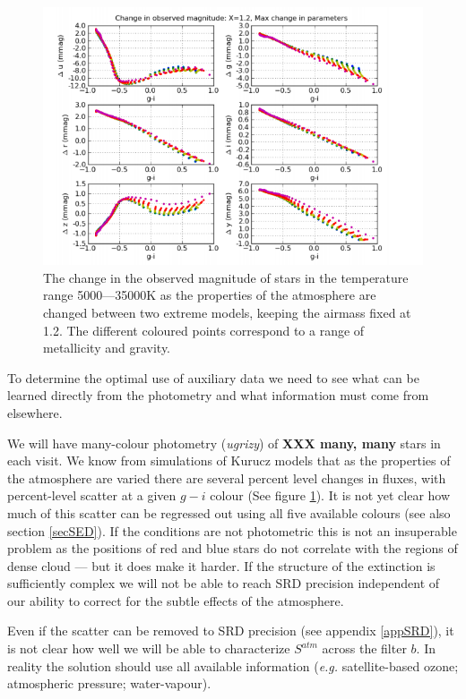 \documentclass[12pt]{article}
\newcommand{\eg}{\textit{e.g.}\xspace}
\newcommand{\XXX}[1]{\textbf{XXX #1}\xspace}
\begin{document}
\begin{figure}
\begin{center}
\includegraphics[width=14cm]{maxAtmosphereDeltas}
\end{center}
\caption{
  \label{figMaxAtmosphereDeltas}
  The change in the observed magnitude of stars in the temperature range 5000---35000K as the properties
  of the atmosphere are changed between two extreme models, keeping the airmass fixed at 1.2.  The different
  coloured points correspond to a range of metallicity and gravity.
  }
\end{figure}

To determine the optimal use of auxiliary data we need to see what can be learned directly from the
photometry and what information must come from elsewhere.

We will have many-colour photometry (\textit{ugrizy}) of \XXX{many, many} stars in each visit.  We know from
simulations of Kurucz models that as the properties of the atmosphere are varied there are several percent
level changes in fluxes, with percent-level scatter at a given $g - i$ colour (See figure
\ref{figMaxAtmosphereDeltas}).  It is not yet clear how much of this scatter can be regressed out using all
five available colours (see also section \ref{secSED}). If the
conditions are not photometric this is not an insuperable problem as the positions of red and blue
stars do not correlate with the regions of dense cloud --- but it does make it harder.  If the structure
of the extinction is sufficiently complex we will not be able to reach SRD precision independent of
our ability to correct for the subtle effects of the atmosphere.

Even if the scatter can be removed to SRD precision (see appendix \ref{appSRD}), it is not clear how well
we will be able to characterize $S^{atm}$ across the filter $b$.  In reality the solution should use all
available information (\eg satellite-based ozone; atmospheric pressure; water-vapour).
\end{document}
